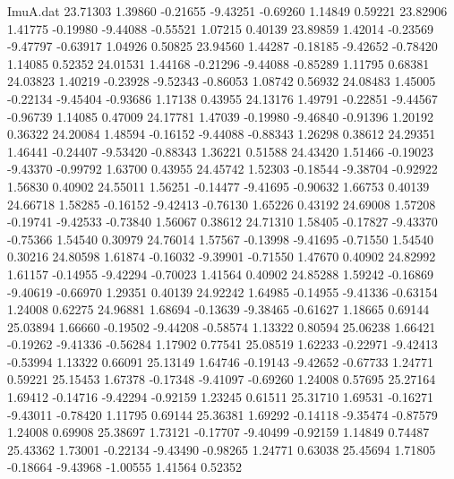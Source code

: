 \begin{filecontents}{ImuA.dat}
  23.71303    1.39860   -0.21655   -9.43251   -0.69260    1.14849    0.59221
  23.82906    1.41775   -0.19980   -9.44088   -0.55521    1.07215    0.40139
  23.89859    1.42014   -0.23569   -9.47797   -0.63917    1.04926    0.50825
  23.94560    1.44287   -0.18185   -9.42652   -0.78420    1.14085    0.52352
  24.01531    1.44168   -0.21296   -9.44088   -0.85289    1.11795    0.68381
  24.03823    1.40219   -0.23928   -9.52343   -0.86053    1.08742    0.56932
  24.08483    1.45005   -0.22134   -9.45404   -0.93686    1.17138    0.43955
  24.13176    1.49791   -0.22851   -9.44567   -0.96739    1.14085    0.47009
  24.17781    1.47039   -0.19980   -9.46840   -0.91396    1.20192    0.36322
  24.20084    1.48594   -0.16152   -9.44088   -0.88343    1.26298    0.38612
  24.29351    1.46441   -0.24407   -9.53420   -0.88343    1.36221    0.51588
  24.43420    1.51466   -0.19023   -9.43370   -0.99792    1.63700    0.43955
  24.45742    1.52303   -0.18544   -9.38704   -0.92922    1.56830    0.40902
  24.55011    1.56251   -0.14477   -9.41695   -0.90632    1.66753    0.40139
  24.66718    1.58285   -0.16152   -9.42413   -0.76130    1.65226    0.43192
  24.69008    1.57208   -0.19741   -9.42533   -0.73840    1.56067    0.38612
  24.71310    1.58405   -0.17827   -9.43370   -0.75366    1.54540    0.30979
  24.76014    1.57567   -0.13998   -9.41695   -0.71550    1.54540    0.30216
  24.80598    1.61874   -0.16032   -9.39901   -0.71550    1.47670    0.40902
  24.82992    1.61157   -0.14955   -9.42294   -0.70023    1.41564    0.40902
  24.85288    1.59242   -0.16869   -9.40619   -0.66970    1.29351    0.40139
  24.92242    1.64985   -0.14955   -9.41336   -0.63154    1.24008    0.62275
  24.96881    1.68694   -0.13639   -9.38465   -0.61627    1.18665    0.69144
  25.03894    1.66660   -0.19502   -9.44208   -0.58574    1.13322    0.80594
  25.06238    1.66421   -0.19262   -9.41336   -0.56284    1.17902    0.77541
  25.08519    1.62233   -0.22971   -9.42413   -0.53994    1.13322    0.66091
  25.13149    1.64746   -0.19143   -9.42652   -0.67733    1.24771    0.59221
  25.15453    1.67378   -0.17348   -9.41097   -0.69260    1.24008    0.57695
  25.27164    1.69412   -0.14716   -9.42294   -0.92159    1.23245    0.61511
  25.31710    1.69531   -0.16271   -9.43011   -0.78420    1.11795    0.69144
  25.36381    1.69292   -0.14118   -9.35474   -0.87579    1.24008    0.69908
  25.38697    1.73121   -0.17707   -9.40499   -0.92159    1.14849    0.74487
  25.43362    1.73001   -0.22134   -9.43490   -0.98265    1.24771    0.63038
  25.45694    1.71805   -0.18664   -9.43968   -1.00555    1.41564    0.52352

\end{filecontents}
